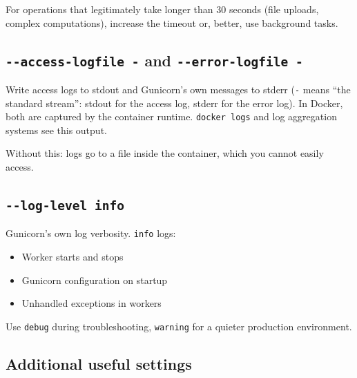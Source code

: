 \noindent{}For operations that legitimately take longer than 30 seconds (file uploads, complex computations), increase the timeout or, better, use background tasks.

\subsection*{\texorpdfstring{\texttt{-\/-access-logfile\ -} and \texttt{-\/-error-logfile\ -}}{-\/-access-logfile - and -\/-error-logfile -}}\label{24-process-startup:--access-logfile---and---error-logfile--}

Write access logs to stdout and Gunicorn's own messages to stderr (\texttt{-} means ``the standard stream'': stdout for the access log, stderr for the error log). In Docker, both are captured by the container runtime. \texttt{docker\ logs} and log aggregation systems see this output.

Without this: logs go to a file inside the container, which you cannot easily access.

\subsection*{\texorpdfstring{\texttt{-\/-log-level\ info}}{-\/-log-level info}}\label{24-process-startup:--log-level-info}

Gunicorn's own log verbosity. \texttt{info} logs:

\begin{itemize}
\tightlist
\item
  Worker starts and stops
\item
  Gunicorn configuration on startup
\item
  Unhandled exceptions in workers
\end{itemize}

\noindent{}Use \texttt{debug} during troubleshooting, \texttt{warning} for a quieter production environment.

\subsection*{Additional useful settings}\label{24-process-startup:additional-useful-settings}

